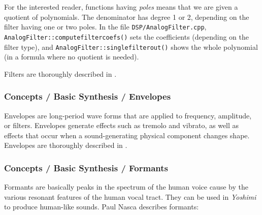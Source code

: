    For the interested reader, functions having \textsl{poles}
   means that we are given a quotient of polynomials. The denominator has
   degree 1 or 2, depending on the filter having one or two poles. In the
   file \texttt{DSP/AnalogFilter.cpp},
   \texttt{AnalogFilter::computefiltercoefs()} sets the coefficients
   (depending on the filter type), and
   \texttt{AnalogFilter::singlefilterout()} shows the whole polynomial (in a
   formula where no quotient is needed).

   Filters are thoroughly described in
   .

\subsubsection{Concepts / Basic Synthesis / Envelopes}
\label{subsubsec:concepts_basics_envelopes}

   Envelopes are long-period wave forms that are applied to frequency,
   amplitude, or filters.  Envelopes generate effects such as tremolo and
   vibrato, as well as effects that occur when a sound-generating physical
   component changes shape.
   Envelopes are thoroughly described in
   .

\subsubsection{Concepts / Basic Synthesis / Formants}
\label{subsubsec:concepts_basics_formants}

   Formants are basically peaks in the spectrum of the human voice cause by
   the various resonant features of the human vocal tract.  They can be used in
   \textsl{Yoshimi} to produce human-like sounds.
   Paul Nasca describes formants:

